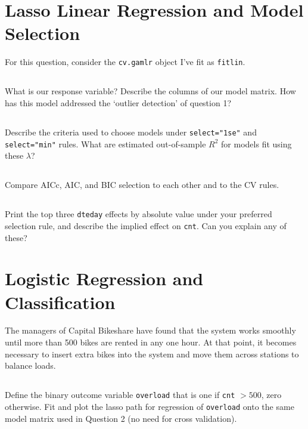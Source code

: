 \documentclass[12pt]{article}
\begin{document}
\newpage
\section{Lasso Linear Regression and Model Selection}

For this question, consider the {\tt cv.gamlr} object I've fit as  {\tt fitlin}.

\subsection{}
What is our response variable?  Describe the columns of our model matrix.  How has this model addressed the `outlier detection' of question 1?

\subsection{} Describe the criteria used to choose models under {\tt select="1se"} and {\tt select="min"} rules.  What are estimated out-of-sample $R^2$ for models fit using these $\lambda$?

\subsection{} Compare AICc, AIC, and BIC selection to each other and to the CV rules. 

\subsection{} Print the top three {\tt dteday} effects by absolute value under your preferred selection rule, and describe the implied effect on \texttt{cnt}. Can you explain any of these?

\newpage
\section{Logistic Regression and Classification}

The managers of Capital Bikeshare have found that the system works smoothly until more than 500 bikes are rented in any one hour.  At that point, it becomes necessary to insert extra bikes into the system and move them across stations to balance loads.

\subsection{}
Define the binary outcome variable {\tt overload} that is one if \texttt{cnt} $>500$, zero otherwise.  Fit and plot the lasso path for regression of {\tt overload} onto the same model matrix used in Question 2 (no need for cross validation). 
\end{document}
